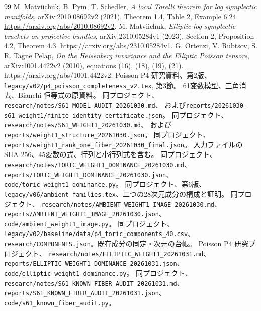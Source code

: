 \documentclass[11pt,a4paper]{ltjsarticle}
\theoremstyle{remark}
\begin{document}
\begingroup\footnotesize
\begin{thebibliography}{99}
\setlength{\itemsep}{0pt}
 M. Matviichuk, B. Pym, T. Schedler,
\textit{A local Torelli theorem for log symplectic manifolds},
arXiv:2010.08692v2 (2021), Theorem 1.4, Table 2, Example 6.24.
\url{https://arxiv.org/abs/2010.08692v2}.
 M. Matviichuk,
\textit{Elliptic log symplectic brackets on projective bundles},
arXiv:2310.05284v1 (2023), Section 2, Proposition 4.2, Theorem 4.3.
\url{https://arxiv.org/abs/2310.05284v1}.
 G. Ortenzi, V. Rubtsov, S. R. Tagne Pelap,
\textit{On the Heisenberg invariance and the Elliptic Poisson tensors},
arXiv:1001.4422v2 (2010), equations (16), (18), (19), (21).
\url{https://arxiv.org/abs/1001.4422v2}.
 Poisson P4 研究資料、第2版、
\nolinkurl{legacy/v02/p4_poisson_completeness_v2.tex}, 第3節。
61変数模型、三角消去、Bianchi 恒等式の原資料。
 同プロジェクト、
\nolinkurl{research/notes/S61_MODEL_AUDIT_20261030.md}、
および\nolinkurl{reports/20261030-s61-weight1/finite_identity_certificate.json}。
 同プロジェクト、
\nolinkurl{research/notes/S61_WEIGHT1_20261030.md}、
および\nolinkurl{reports/weight1_structure_20261030.json}。
 同プロジェクト、
\nolinkurl{reports/weight1_rank_one_fiber_20261030_final.json}。
入力ファイルの SHA-256、45変数の式、行列と小行列式を含む。
 同プロジェクト、
\nolinkurl{research/notes/TORIC_WEIGHT1_DOMINANCE_20261030.md}、
\nolinkurl{reports/TORIC_WEIGHT1_DOMINANCE_20261030.json}、
\nolinkurl{code/toric_weight1_dominance.py}。
 同プロジェクト、第6版、
\nolinkurl{legacy/v06/ambient_families.tex}、二つの28次元成分の構成と証明。
 同プロジェクト、
\nolinkurl{research/notes/AMBIENT_WEIGHT1_IMAGE_20261030.md}、
\nolinkurl{reports/AMBIENT_WEIGHT1_IMAGE_20261030.json}、
\nolinkurl{code/ambient_weight1_image.py}。
 同プロジェクト、
\nolinkurl{legacy/v02/baseline/data/p4_toric_components_40.csv}、
\nolinkurl{research/COMPONENTS.json}。既存成分の同定・次元の台帳。
 Poisson P4 研究プロジェクト、
\nolinkurl{research/notes/ELLIPTIC_WEIGHT1_20261031.md}、
\nolinkurl{reports/ELLIPTIC_WEIGHT1_DOMINANCE_20261031.json}、
\nolinkurl{code/elliptic_weight1_dominance.py}。
 同プロジェクト、
\nolinkurl{research/notes/S61_KNOWN_FIBER_AUDIT_20261031.md}、
\nolinkurl{reports/S61_KNOWN_FIBER_AUDIT_20261031.json}、
\nolinkurl{code/s61_known_fiber_audit.py}。

\end{thebibliography}
\end{document}
